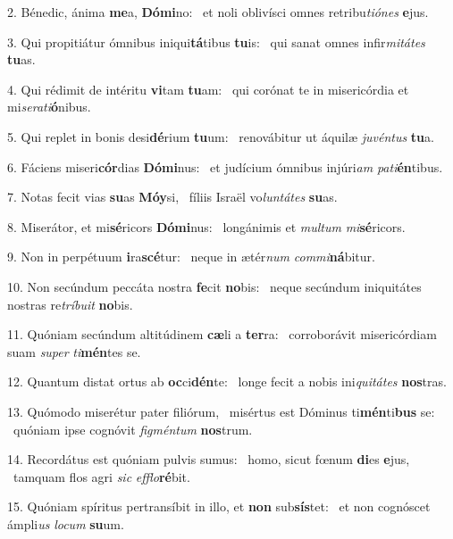 2. Bénedic, ánima \textbf{me}a, \textbf{Dó}\textbf{mi}no: \ast\  et noli oblivísci omnes retribu\textit{ti}\textit{ó}\textit{nes} \textbf{e}jus.\

3. Qui propitiátur ómnibus iniqui\textbf{tá}tibus \textbf{tu}is: \ast\  qui sanat omnes infir\textit{mi}\textit{tá}\textit{tes} \textbf{tu}as.\

4. Qui rédimit de intéritu \textbf{vi}tam \textbf{tu}am: \ast\  qui corónat te in misericórdia et mi\textit{se}\textit{ra}\textit{ti}\textbf{ó}nibus.\

5. Qui replet in bonis desi\textbf{dé}rium \textbf{tu}um: \ast\  renovábitur ut áquilæ \textit{ju}\textit{vén}\textit{tus} \textbf{tu}a.\

6. Fáciens miseri\textbf{cór}dias \textbf{Dó}\textbf{mi}nus: \ast\  et judícium ómnibus injúri\textit{am} \textit{pa}\textit{ti}\textbf{én}tibus.\

7. Notas fecit vias \textbf{su}as \textbf{Mó}\textbf{y}si, \ast\  fíliis Israël vo\textit{lun}\textit{tá}\textit{tes} \textbf{su}as.\

8. Miserátor, et mi\textbf{sé}ricors \textbf{Dó}\textbf{mi}nus: \ast\  longánimis et \textit{mul}\textit{tum} \textit{mi}\textbf{sé}ricors.\

9. Non in perpétuum \textbf{i}ra\textbf{scé}tur: \ast\  neque in ætér\textit{num} \textit{com}\textit{mi}\textbf{ná}bitur.\

10. Non secúndum peccáta nostra \textbf{fe}cit \textbf{no}bis: \ast\  neque secúndum iniquitátes nostras re\textit{trí}\textit{bu}\textit{it} \textbf{no}bis.\

11. Quóniam secúndum altitúdinem \textbf{cæ}li a \textbf{ter}ra: \ast\  corroborávit misericórdiam suam \textit{su}\textit{per} \textit{ti}\textbf{mén}tes se.\

12. Quantum distat ortus ab \textbf{oc}ci\textbf{dén}te: \ast\  longe fecit a nobis ini\textit{qui}\textit{tá}\textit{tes} \textbf{nos}tras.\

13. Quómodo miserétur pater filiórum, \dag\  misértus est Dóminus ti\textbf{mén}ti\textbf{bus} se: \ast\  quóniam ipse cognóvit \textit{fig}\textit{mén}\textit{tum} \textbf{nos}trum.\

14. Recordátus est quóniam pulvis sumus: \dag\  homo, sicut fœnum \textbf{di}es \textbf{e}jus, \ast\  tamquam flos agri \textit{sic} \textit{ef}\textit{flo}\textbf{ré}bit.\

15. Quóniam spíritus pertransíbit in illo, et \textbf{non} sub\textbf{sís}tet: \ast\  et non cognóscet ámpli\textit{us} \textit{lo}\textit{cum} \textbf{su}um.\

